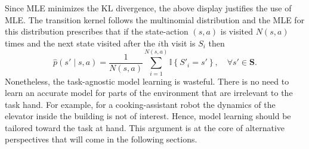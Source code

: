\documentclass[a4paper]{article}
\theoremstyle{definition}
\theoremstyle{remark}
\theoremstyle{plain}
\newcommand{\bS}{\mathbf{S}}
\newcommand{\II}{\mathbb{I}}
\begin{document}
Since MLE minimizes the KL divergence, the above display justifies the use of MLE. The transition kernel follows the multinomial distribution and the MLE for this distribution prescribes that if the state-action $(s, a)$ is visited $N(s, a)$ times and the next state visited after the $i$th visit is $S_i$ then
\begin{equation*}
    \hat{p}\left(s' \middle\vert s, a\right) = \frac{1}{N(s, a)}\sum_{i=1}^{N(s, a)}\II\left\{S'_i = s'\right\},\quad  \forall s' \in \bS.
\end{equation*}
%
Nonetheless, the task-agnostic model learning is wasteful. There is no need to learn an accurate model for parts of the environment that are irrelevant to the task hand. For example, for a cooking-assistant robot the dynamics of the elevator inside the building is not of interest. Hence, model learning should be tailored toward the task at hand. This argument is at the core of alternative perspectives that will come in the following sections.
\end{document}
